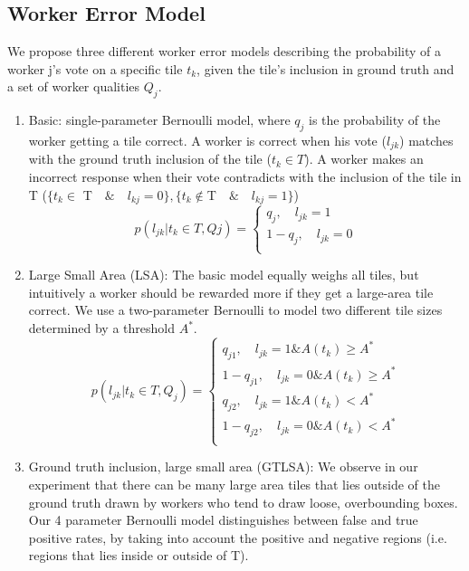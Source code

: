 \documentclass[letterpaper]{article} %
\begin{document}
\subsection{Worker Error Model}
We propose three different worker error models describing the probability of a worker j's vote on a specific tile $t_k$, given the tile's inclusion in ground truth and a set of worker qualities $Q_j$. 
\begin{enumerate}
\item Basic: single-parameter Bernoulli model, where $q_j$ is the probability of the worker getting a tile correct. A worker is correct when his vote ($l_{jk}$) matches with the ground truth inclusion of the tile ($t_k\in T$). A worker makes an incorrect response when their vote contradicts with the inclusion of the tile in T ($\{t_k\in$ T$\quad\&\quad l_{kj}=0\}, \{t_k\notin $T$\quad\&\quad l_{kj}=1\}$)
\begin{equation}
p(l_{jk}|t_k\in T, Qj) = \begin{cases}
               q_j, \quad l_{jk}=1\\
               1-q_j, \quad l_{jk}=0\\
            \end{cases}
\end{equation}
\item Large Small Area (LSA): The basic model equally weighs all tiles, but intuitively a worker should be rewarded more if they get a large-area tile correct. We use a two-parameter Bernoulli to model two different tile sizes determined by a threshold $A^*$.
\begin{equation}
p(l_{jk}|t_k\in T,Q_j) = \begin{cases}
               q_{j1}, \quad l_{jk}=1 \& A(t_k)\geq A^*\\
               1-q_{j1}, \quad l_{jk}=0 \& A(t_k)\geq A^*\\
                q_{j2}, \quad l_{jk}=1 \& A(t_k)< A^*\\
               1-q_{j2}, \quad l_{jk}=0 \& A(t_k)< A^*\\
            \end{cases}
\end{equation}
\item Ground truth inclusion, large small area (GTLSA): We observe in our experiment that there can be many large area tiles that lies outside of the ground truth drawn by workers who tend to draw loose, overbounding boxes. Our 4 parameter Bernoulli model distinguishes between false and true positive rates, by taking into account the positive and negative regions (i.e. regions that lies inside or outside of T). 

\end{enumerate}
\end{document}
